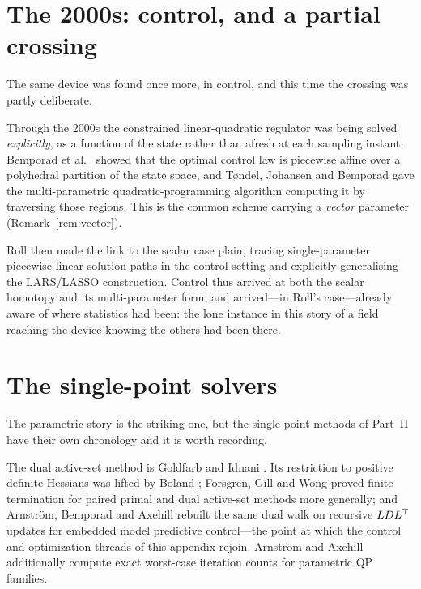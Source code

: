 \section{The 2000s: control, and a partial crossing}

The same device was found once more, in control, and this time the crossing was partly
deliberate.

Through the 2000s the constrained linear-quadratic regulator was being solved
\emph{explicitly}, as a function of the state rather than afresh at each sampling
instant. Bemporad et al.\ \cite{bemporad2002} showed that the optimal control law is
piecewise affine over a polyhedral partition of the state space, and Tøndel, Johansen and
Bemporad \cite{tondel2003} gave the multi-parametric quadratic-programming algorithm
computing it by traversing those regions. This is the common scheme carrying a
\emph{vector} parameter (Remark~\ref{rem:vector}).

Roll \cite{roll2008} then made the link to the scalar case plain, tracing
single-parameter piecewise-linear solution paths in the control setting and explicitly
generalising the LARS/LASSO construction. Control thus arrived at both the scalar
homotopy and its multi-parameter form, and arrived---in Roll's case---already aware of
where statistics had been: the lone instance in this story of a field reaching the device
knowing the others had been there.

\section{The single-point solvers}

The parametric story is the striking one, but the single-point methods of Part~II have
their own chronology and it is worth recording.

The dual active-set method is Goldfarb and Idnani
\cite{goldfarb1982,goldfarb1983}. Its restriction to positive definite Hessians was
lifted by Boland \cite{boland1997}; Forsgren, Gill and Wong \cite{forsgren2016} proved
finite termination for paired primal and dual active-set methods more generally; and
Arnström, Bemporad and Axehill \cite{arnstrom2022daqp} rebuilt the same dual walk on
recursive $LDL^{\top}$ updates for embedded model predictive control---the point at which the
control and optimization threads of this appendix rejoin. Arnström and Axehill
\cite{arnstrom2022certification} additionally compute exact worst-case iteration counts
for parametric QP families.

